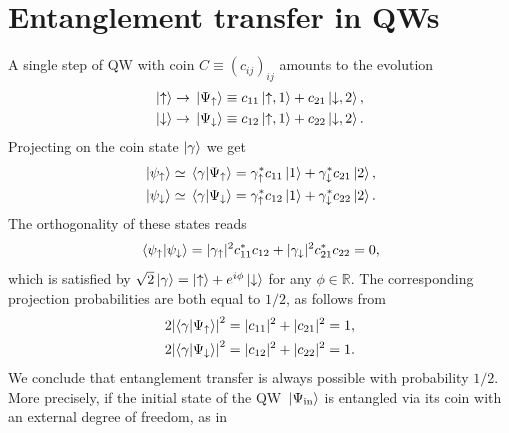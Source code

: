 \documentclass[
	aps, pra,
	superscriptaddress, twocolumn,
	floatfix,
	10pt
]{revtex4-1}
\newcommand{\on}[1]{\operatorname{#1}}
\newcommand{\parTitle}[1]{\noindent{\color{Mahogany}(\emph{#1})}}
\newcommand{\RR}{\mathbb{R}}
\newcommand{\calW}{{\mathcal{W}}}
\begin{document}
\section{Entanglement transfer in QWs}
\label{sec:entanglement_transfer_in_QWs}

\parTitle{Single step}
A single step of QW with coin $C\equiv (c_{ij})_{ij}$ amounts to the evolution
\begin{equation}
\begin{aligned}
	\ket\uparrow&\rightarrow \ket*{\Psi_\uparrow} \equiv c_{11}\ket{\uparrow,1} + c_{21}\ket{\downarrow,2}, \\
	\ket\downarrow&\rightarrow \ket*{\Psi_\downarrow} \equiv c_{12}\ket{\uparrow,1} + c_{22}\ket{\downarrow,2}.
\end{aligned}
\end{equation}
Projecting on the coin state $\ket\gamma$ we get
\begin{equation}
\begin{aligned}
	\ket*{\psi_\uparrow} \simeq \braket*{\gamma}{\Psi_\uparrow} &= \gamma_\uparrow^*c_{11}\ket1 + \gamma_\downarrow^* c_{21}\ket2, \\
	\ket*{\psi_\downarrow} \simeq \braket*{\gamma}{\Psi_\downarrow} &= \gamma_\uparrow^* c_{12} \ket1 + \gamma_\downarrow^* c_{22} \ket2.
\end{aligned}
\end{equation}
The orthogonality of these states reads
\begin{equation}
\begin{gathered}
	\braket*{\psi_\uparrow}{\psi_\downarrow}
	= |\gamma_\uparrow|^2 c_{11}^* c_{12} + |\gamma_\downarrow|^2 c_{21}^* c_{22} = 0,
\end{gathered}
\end{equation}
which is satisfied by $\sqrt2\ket\gamma = \ket\uparrow + e^{i\phi}\ket\downarrow$ for any $\phi\in\RR$.
The corresponding projection probabilities are both equal to $1/2$, as follows from
\begin{equation}
\begin{aligned}
	2\abs{\braket{\gamma}{\Psi_\uparrow}}^2 &= |c_{11}|^2 + |c_{21}|^2 = 1, \\
	2\abs{\braket{\gamma}{\Psi_\downarrow}}^2 &= |c_{12}|^2 + |c_{22}|^2 = 1.
\end{aligned}
\end{equation}
We conclude that entanglement transfer is always possible with probability $1/2$.
More precisely, if the initial state of the QW $\ket*{\Psi_{\on{in}}}$ is entangled via its coin with an external degree of freedom, as in
\end{document}
